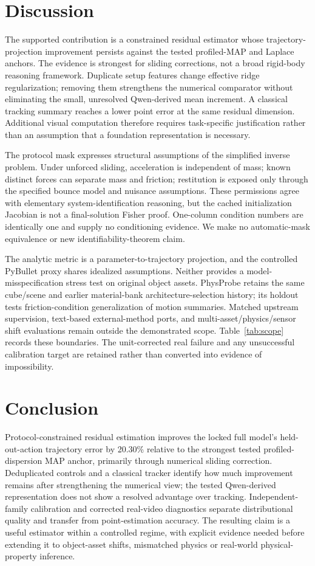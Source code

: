 \documentclass{ieeeaccess}
\begin{document}
\section{Discussion}\label{sec:discussion}
The supported contribution is a constrained residual estimator whose trajectory-projection improvement persists against the tested profiled-MAP and Laplace anchors. The evidence is strongest for sliding corrections, not a broad rigid-body reasoning framework. Duplicate setup features change effective ridge regularization; removing them strengthens the numerical comparator without eliminating the small, unresolved Qwen-derived mean increment. A classical tracking summary reaches a lower point error at the same residual dimension. Additional visual computation therefore requires task-specific justification rather than an assumption that a foundation representation is necessary.

The protocol mask expresses structural assumptions of the simplified inverse problem. Under unforced sliding, acceleration is independent of mass; known distinct forces can separate mass and friction; restitution is exposed only through the specified bounce model and nuisance assumptions. These permissions agree with elementary system-identification reasoning, but the cached initialization Jacobian is not a final-solution Fisher proof. One-column condition numbers are identically one and supply no conditioning evidence. We make no automatic-mask equivalence or new identifiability-theorem claim.

The analytic metric is a parameter-to-trajectory projection, and the controlled PyBullet proxy shares idealized assumptions. Neither provides a model-misspecification stress test on original object assets. PhysProbe retains the same cube/scene and earlier material-bank architecture-selection history; its holdout tests friction-condition generalization of motion summaries. Matched upstream supervision, text-based external-method ports, and multi-asset/physics/sensor shift evaluations remain outside the demonstrated scope. Table~\ref{tab:scope} records these boundaries. The unit-corrected real failure and any unsuccessful calibration target are retained rather than converted into evidence of impossibility.

\section{Conclusion}\label{sec:conclusion}
Protocol-constrained residual estimation improves the locked full model's held-out-action trajectory error by 20.30\% relative to the strongest tested profiled-dispersion MAP anchor, primarily through numerical sliding correction. Deduplicated controls and a classical tracker identify how much improvement remains after strengthening the numerical view; the tested Qwen-derived representation does not show a resolved advantage over tracking. Independent-family calibration and corrected real-video diagnostics separate distributional quality and transfer from point-estimation accuracy. The resulting claim is a useful estimator within a controlled regime, with explicit evidence needed before extending it to object-asset shifts, mismatched physics or real-world physical-property inference.
\end{document}
